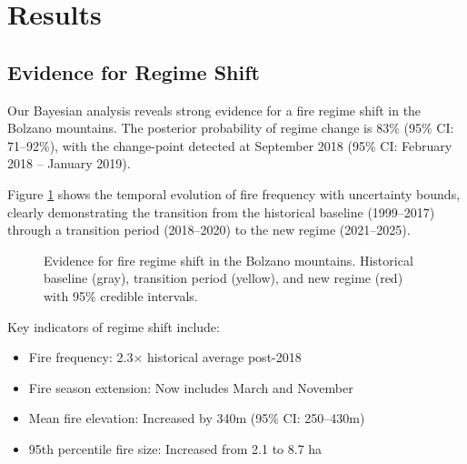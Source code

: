 \documentclass[11pt,a4paper]{article}
\begin{document}
\section{Results}

\subsection{Evidence for Regime Shift}

Our Bayesian analysis reveals strong evidence for a fire regime shift in the Bolzano mountains. The posterior probability of regime change is 83\% (95\% CI: 71--92\%), with the change-point detected at September 2018 (95\% CI: February 2018 -- January 2019).

Figure \ref{fig:regime_shift} shows the temporal evolution of fire frequency with uncertainty bounds, clearly demonstrating the transition from the historical baseline (1999--2017) through a transition period (2018--2020) to the new regime (2021--2025).

\begin{figure}[H]
\centering
\caption{Evidence for fire regime shift in the Bolzano mountains. Historical baseline (gray), transition period (yellow), and new regime (red) with 95\% credible intervals.}
\label{fig:regime_shift}
\end{figure}

Key indicators of regime shift include:
\begin{itemize}
    \item Fire frequency: 2.3× historical average post-2018
    \item Fire season extension: Now includes March and November
    \item Mean fire elevation: Increased by 340m (95\% CI: 250--430m)
    \item 95th percentile fire size: Increased from 2.1 to 8.7 ha
\end{itemize}
\end{document}
